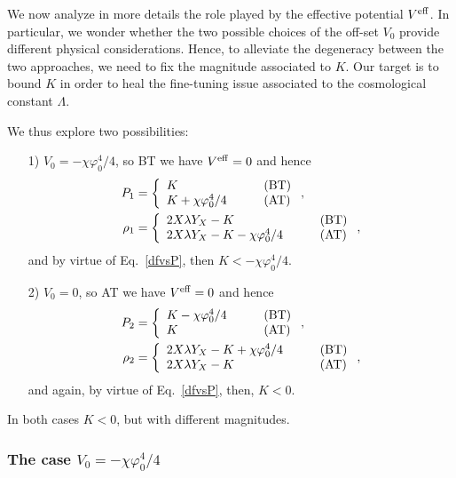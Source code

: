 \documentclass[twocolumn,showpacs, nofootinbib,aps,superscriptaddress, eqsecnum,prd,prl,notitlepage,showkeys,10pt,reprint]{revtex4-1}
\begin{document}
We now analyze in more details the role played by the effective potential $V^{\rm eff}$. In particular, we wonder whether the two possible choices of the off-set $V_0$ provide different physical considerations.
Hence, to alleviate the degeneracy between the two approaches, we need to fix the magnitude associated to $K$. Our target is to bound $K$ in order to heal the fine-tuning issue associated to the cosmological constant $\Lambda$.

We thus explore two possibilities:
%
\begin{itemize}
%
\item[1)]{$V_0= -\chi\varphi_0^4/4$, so BT we have $V^{\rm eff}=0$ and hence
%
\begin{align}
\label{s8bbb}
P_1&= \left\{
\begin{array}{ll}
K\quad &\quad{\rm (BT)}\\
K+\chi \varphi_0^4/4\quad&\quad{\rm (AT)}
\end{array}
\right.,\\
\label{s8bisbbb}
\rho_1&= \left\{
\begin{array}{ll}
2X\lambda Y_X-K\quad &\quad{\rm (BT)}\\
2X\lambda Y_X-K-\chi \varphi_0^4/4\quad&\quad{\rm (AT)}
\end{array}
\right.,
\end{align}
%
and by virtue of Eq.~\eqref{dfvsP}, then $K<-\chi \varphi_0^4/4$.}
%
\item[2)]{$V_0=0$, so AT we have $V^{\rm eff}=0$ and hence
%
\begin{align}
\label{s8ccc}
P_2&= \left\{
\begin{array}{ll}
K-\chi \varphi_0^4/4\quad &\quad{\rm (BT)}\\
K\quad&\quad{\rm (AT)}
\end{array}
\right.,\\
\label{s8bisccc}
\rho_2&= \left\{
\begin{array}{ll}
2X\lambda Y_X-K+\chi \varphi_0^4/4\quad &\quad{\rm (BT)}\\
2X\lambda Y_X-K\quad&\quad{\rm (AT)}
\end{array}
\right.,
\end{align}
%
and again, by virtue of Eq.~\eqref{dfvsP}, then, $K<0$.}
%
\end{itemize}
%
In both cases $K<0$, but with different magnitudes.


\subsubsection{The case $V_0= -\chi\varphi_0^4/4$}
\end{document}
